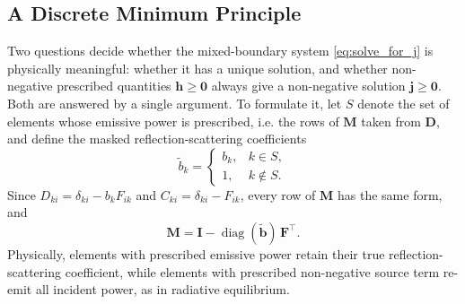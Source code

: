 \documentclass[preprint,1p,times]{elsarticle}
\theoremstyle{plain}
\theoremstyle{definition}
\theoremstyle{remark}
\begin{document}
\subsection{A Discrete Minimum Principle}
\label{sec:min_principle}

Two questions decide whether the mixed-boundary system \eqref{eq:solve_for_j} is physically meaningful: whether it has a unique solution, and whether non-negative prescribed quantities $\mathbf{h} \geq \mathbf{0}$ always give a non-negative solution $\mathbf{j} \geq \mathbf{0}$. Both are answered by a single argument. To formulate it, let $S$ denote the set of elements whose emissive power is prescribed, i.e. the rows of $\mathbf{M}$ taken from $\mathbf{D}$, and define the masked reflection-scattering coefficients
\begin{equation}
\tilde{b}_k =
\begin{cases}
b_k, & k \in S, \\
1, & k \notin S.
\end{cases}
\label{eq:masked_albedo}
\end{equation}
Since $D_{ki} = \delta_{ki} - b_k F_{ik}$ and $C_{ki} = \delta_{ki} - F_{ik}$, every row of $\mathbf{M}$ has the same form, and
\begin{equation}
\mathbf{M} = \mathbf{I} - \operatorname{diag}(\tilde{\mathbf{b}})\,\mathbf{F}^\top .
\label{eq:M_masked}
\end{equation}
Physically, elements with prescribed emissive power retain their true reflection-scattering coefficient, while elements with prescribed non-negative source term re-emit all incident power, as in radiative equilibrium.
\end{document}

